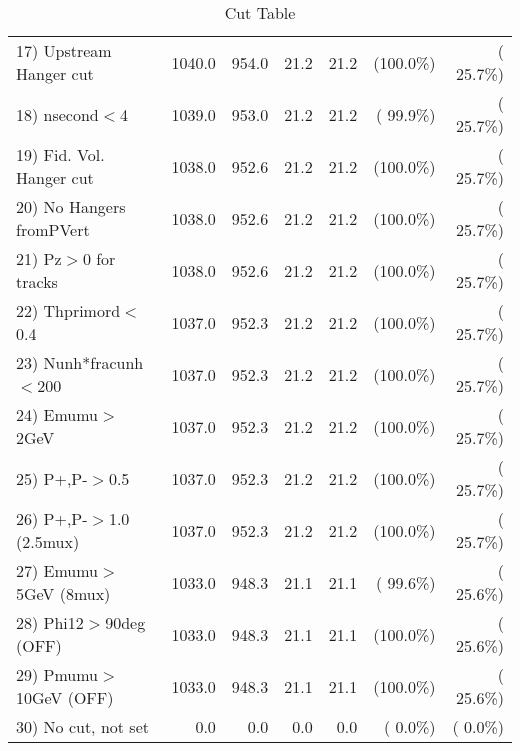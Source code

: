 \begin{table}[h!]
\begin{tabular}{||l||r|r|r|r|r|r||}
 17) Upstream Hanger cut  &       1040.0 &        954.0 &         21.2 &         21.2 & (100.0\%) & ( 25.7\%) \\
 18) nsecond$<$4          &       1039.0 &        953.0 &         21.2 &         21.2 & ( 99.9\%) & ( 25.7\%) \\
 19) Fid. Vol. Hanger cut &       1038.0 &        952.6 &         21.2 &         21.2 & (100.0\%) & ( 25.7\%) \\
 20) No Hangers fromPVert &       1038.0 &        952.6 &         21.2 &         21.2 & (100.0\%) & ( 25.7\%) \\
 21) Pz$>$0 for tracks    &       1038.0 &        952.6 &         21.2 &         21.2 & (100.0\%) & ( 25.7\%) \\
 22) Thprimord$<$0.4      &       1037.0 &        952.3 &         21.2 &         21.2 & (100.0\%) & ( 25.7\%) \\
 23) Nunh*fracunh$<$200   &       1037.0 &        952.3 &         21.2 &         21.2 & (100.0\%) & ( 25.7\%) \\
 24) Emumu$>$2GeV         &       1037.0 &        952.3 &         21.2 &         21.2 & (100.0\%) & ( 25.7\%) \\
 25) P+,P-$>$0.5          &       1037.0 &        952.3 &         21.2 &         21.2 & (100.0\%) & ( 25.7\%) \\
 26) P+,P-$>$1.0 (2.5mux) &       1037.0 &        952.3 &         21.2 &         21.2 & (100.0\%) & ( 25.7\%) \\
 27) Emumu$>$5GeV  (8mux) &       1033.0 &        948.3 &         21.1 &         21.1 & ( 99.6\%) & ( 25.6\%) \\
 28) Phi12$>$90deg  (OFF) &       1033.0 &        948.3 &         21.1 &         21.1 & (100.0\%) & ( 25.6\%) \\
 29) Pmumu$>$10GeV  (OFF) &       1033.0 &        948.3 &         21.1 &         21.1 & (100.0\%) & ( 25.6\%) \\
 30) No cut, not set      &          0.0 &          0.0 &          0.0 &          0.0 & (  0.0\%) & (  0.0\%) \\
 \hline
 \hline
 \end{tabular}
 \caption{Cut Table           }
 \label{tab-cutheavy_neutrino_2.000}
 \end{table}
